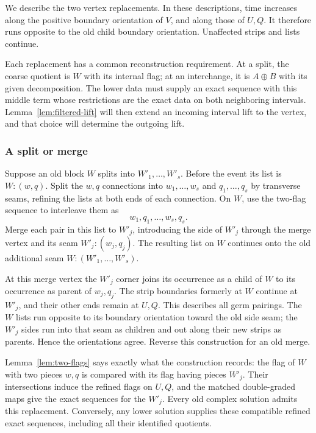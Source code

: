 We describe the two vertex replacements.  In these descriptions,
time increases along the positive boundary orientation of $V$, and
along those of $U,Q$.  It therefore runs opposite to the old child
boundary orientation.  Unaffected strips and lists continue.

Each replacement has a common reconstruction requirement.  At a split,
the coarse quotient is $W$ with its internal flag; at an interchange,
it is $A\oplus B$ with its given decomposition.  The lower data must
supply an exact sequence with this middle term whose restrictions
are the exact data on both neighboring intervals.
Lemma~\ref{lem:filtered-lift} will then extend an incoming interval
lift to the vertex, and that choice will determine the outgoing lift.

\subsubsection*{A split or merge}

Suppose an old block $W$ splits into $W'_1,\ldots,W'_s$.  Before
the event its list is $W:(w,q)$.  Split the $w,q$ connections into
$w_1,\ldots,w_s$ and $q_1,\ldots,q_s$ by transverse seams, refining
the lists at both ends of each connection.  On $W$, use the
two-flag sequence to interleave them as
\[
 w_1,q_1,\ldots,w_s,q_s.
\]
Merge each pair in this list to $W'_j$, introducing the side of
$W'_j$ through the merge vertex and its seam $W'_j:(w_j,q_j)$.
The resulting list on $W$ continues onto the old additional seam
$W:(W'_1,\ldots,W'_s)$.

At this merge vertex the $W'_j$ corner joins its occurrence as a
child of $W$ to its occurrence as parent of $w_j,q_j$.  The strip
boundaries formerly at $W$ continue at $W'_j$, and their other ends
remain at $U,Q$.  This describes all germ pairings.  The $W$ lists
run opposite to its boundary orientation toward the old side seam;
the $W'_j$ sides run into that seam as children and out along their
new strips as parents.  Hence the orientations agree.  Reverse
this construction for an old merge.

Lemma~\ref{lem:two-flags} says exactly what the construction records:
the flag of $W$ with two pieces $w,q$ is compared with its flag
having pieces $W'_j$.  Their intersections induce the refined flags
on $U,Q$, and the matched double-graded maps give the exact sequences
for the $W'_j$.  Every old complex solution admits this replacement.
Conversely, any lower solution supplies these compatible refined
exact sequences, including all their identified quotients.

